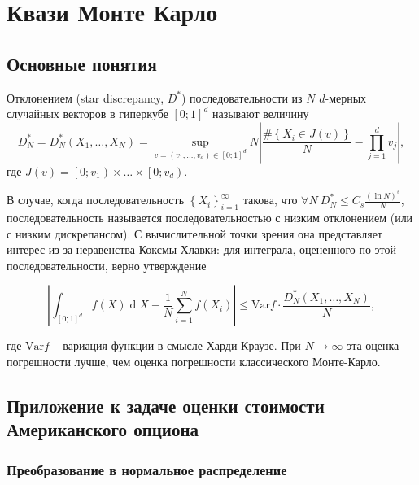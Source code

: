 \documentclass[specialist,
               substylefile = ../spbu.rtx,
               subf,href,colorlinks=true, 10pt]{disser}
\newcommand{\abs}[1]{\left\lvert#1\right\rvert}
\DeclareMathOperator{\dd}{d}
\begin{document}


\chapter{Квази Монте Карло} %
\label{cha:quasi_monte_carlo}

\section{Основные понятия} %
\label{sec:quasi_mc_definition}

Отклонением (star discrepancy, $D^*$) последовательности из $N$ $d$-мерных случайных векторов в гиперкубе $\left[0;1\right]^d$ называют величину
$$D_N^* = D_N^*\left(X_1, \dots, X_N\right) = \sup_{v = (v_1, \dots, v_d) \in \left[0;1\right]^d} N \abs{\frac{\#\left\{ X_i \in J(v) \right\}}{N} - \prod_{j = 1}^d v_j},$$
где $J(v) = \left[0; v_1\right) \times \dots \times \left[0; v_d\right)$.

В случае, когда последовательность $\left\{ X_i\right\}_{i=1}^\infty$ такова, что $\forall N \: D_N^* \leq C_s \frac{(\ln N)^s}{N}$, последовательность называется последовательностью с низким отклонением (или с низким дискрепансом). С вычислительной точки зрения она представляет интерес из-за неравенства Коксмы-Хлавки: для интеграла, оцененного по этой последовательности, верно утверждение

$$\abs{\int_{\left[0;1\right]^d} f(X) \dd X - \frac{1}{N}\sum_{i=1}^N f(X_i)} \leq \mathrm{Var}f\cdot \frac{D_N^*\left(X_1, \dots, X_N\right)}{N},$$

где $\mathrm{Var}f$ -- вариация функции в смысле Харди-Краузе. При $N\to\infty$ эта оценка погрешности лучше, чем оценка погрешности классического Монте-Карло.

\section{Приложение к задаче оценки стоимости Американского опциона} %
\label{sec:monte_carlo_in_option_pricing}

\subsection{Преобразование в нормальное распределение} %
\label{sub:uniform_normal_transform}
\end{document}
